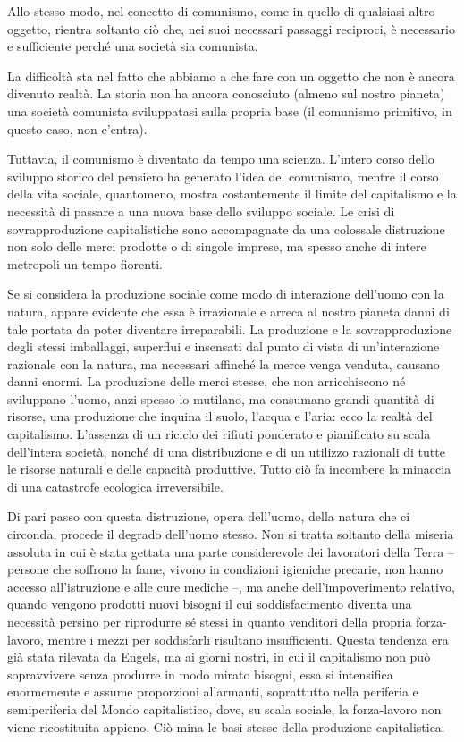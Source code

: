 \documentclass[../main]{subfiles}
\begin{document}
Allo stesso modo, nel concetto di comunismo, come in quello di qualsiasi altro oggetto, rientra soltanto ciò che, nei suoi necessari passaggi reciproci, è necessario e sufficiente perché una società sia comunista.

La difficoltà sta nel fatto che abbiamo a che fare con un oggetto che non è ancora divenuto realtà. La storia non ha ancora conosciuto (almeno sul nostro pianeta) una società comunista sviluppatasi sulla propria base (il comunismo primitivo, in questo caso, non c'entra).

Tuttavia, il comunismo è diventato da tempo una scienza. L'intero corso dello sviluppo storico del pensiero ha generato l'idea del comunismo, mentre il corso della vita sociale, quantomeno, mostra costantemente il limite del capitalismo e la necessità di passare a una nuova base dello sviluppo sociale. Le crisi di sovrapproduzione capitalistiche sono accompagnate da una colossale distruzione non solo delle merci prodotte o di singole imprese, ma spesso anche di intere metropoli un tempo fiorenti.

Se si considera la produzione sociale come modo di interazione dell'uomo con la natura, appare evidente che essa è irrazionale e arreca al nostro pianeta danni di tale portata da poter diventare irreparabili. La produzione e la sovrapproduzione degli stessi imballaggi, superflui e insensati dal punto di vista di un'interazione razionale con la natura, ma necessari affinché la merce venga venduta, causano danni enormi. La produzione delle merci stesse, che non arricchiscono né sviluppano l'uomo, anzi spesso lo mutilano, ma consumano grandi quantità di risorse, una produzione che inquina il suolo, l'acqua e l'aria: ecco la realtà del capitalismo. L'assenza di un riciclo dei rifiuti ponderato e pianificato su scala dell'intera società, nonché di una distribuzione e di un utilizzo razionali di tutte le risorse naturali e delle capacità produttive. Tutto ciò fa incombere la minaccia di una catastrofe ecologica irreversibile.

Di pari passo con questa distruzione, opera dell'uomo, della natura che ci circonda, procede il degrado dell'uomo stesso. Non si tratta soltanto della miseria assoluta in cui è stata gettata una parte considerevole dei lavoratori della Terra – persone che soffrono la fame, vivono in condizioni igieniche precarie, non hanno accesso all'istruzione e alle cure mediche –, ma anche dell'impoverimento relativo, quando vengono prodotti nuovi bisogni il cui soddisfacimento diventa una necessità persino per riprodurre sé stessi in quanto venditori della propria forza-lavoro, mentre i mezzi per soddisfarli risultano insufficienti. Questa tendenza era già stata rilevata da Engels, ma ai giorni nostri, in cui il capitalismo non può sopravvivere senza produrre in modo mirato bisogni, essa si intensifica enormemente e assume proporzioni allarmanti, soprattutto nella periferia e semiperiferia del Mondo capitalistico, dove, su scala sociale, la forza-lavoro non viene ricostituita appieno. Ciò mina le basi stesse della produzione capitalistica.
\end{document}

